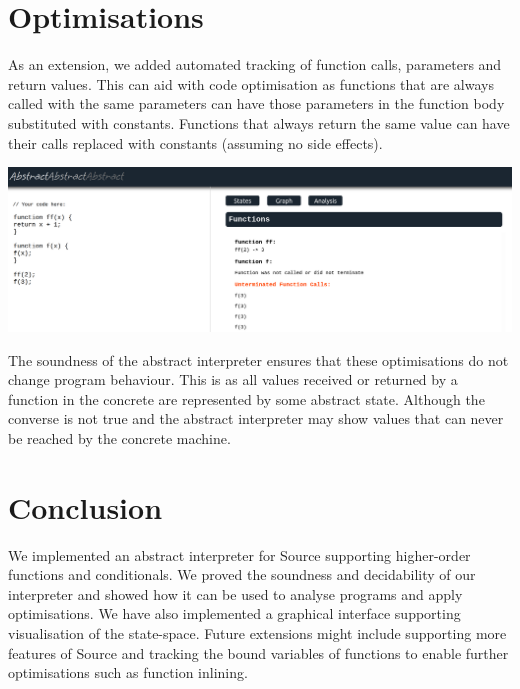 \documentclass[12pt]{article}
\begin{document}

\section{Optimisations}
As an extension, we added automated tracking of function calls, parameters and return values. This can aid with code optimisation as functions that are always called with the same parameters can have those parameters in the function body substituted with constants. Functions that always return the same value can have their calls replaced with constants (assuming no side effects). 

\includegraphics[scale=0.1]{ss4.png}

The soundness of the abstract interpreter ensures that these optimisations do not change program behaviour. This is as all values received or returned by a function in the concrete are represented by some abstract state. Although the converse is not true and the abstract interpreter may show values that can never be reached by the concrete machine.


\section{Conclusion}
We implemented an abstract interpreter for Source supporting higher-order functions and conditionals. We proved the soundness and decidability of our interpreter and showed how it can be used to analyse programs and apply optimisations. We have also implemented a graphical interface supporting visualisation of the state-space. Future extensions might include supporting more features of Source and tracking the bound variables of functions to enable further optimisations such as function inlining. 



\end{document}
